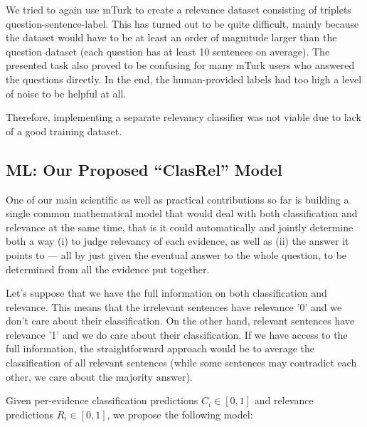 \documentclass[11pt,a4paper]{article}
\begin{document}
We tried to again use mTurk to create a relevance dataset consisting of triplets question-sentence-label.
This has turned out to be quite difficult, mainly because the dataset would have to be at least an order of magnitude larger than the question dataset (each question has at least 10 sentences on average).
The presented task also proved to be confusing for many mTurk users who answered the questions directly.
In the end, the human-provided labels had too high a level of noise to be helpful at all.

Therefore, implementing a separate relevancy classifier was not viable due to lack of a good training dataset.

\subsection{ML: Our Proposed ``ClasRel'' Model}
\label{sec:clasrel}

One of our main scientific as well as practical contributions so far is
building a single common mathematical model that would deal with both classification and relevance at the same time,
that is it could automatically and jointly determine both a way
(i) to judge relevancy of each evidence, as well as
(ii) the answer it points to --- all by just given the eventual answer to the whole question,
to be determined from all the evidence put together.

Let's suppose that we have the full information on both classification and relevance.
This means that the irrelevant sentences have relevance '0' and we don't care about their classification.
On the other hand, relevant sentences have relevance '1' and we do care about their classification.
If we have access to the full information, the straightforward approach would be to average the classification
of all relevant sentences (while some sentences may contradict each other, we care about the majority answer).

Given per-evidence classification predictions $C_i \in [0,1]$ and relevance predictions $R_i \in [0,1]$, we propose the following model:\\
\end{document}
